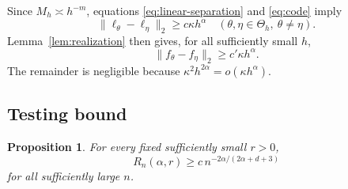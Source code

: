 \documentclass[11pt]{article}
\newtheorem{proposition}[theorem]{Proposition}
\theoremstyle{remark}
\begin{document}
Since \(M_h\asymp h^{-m}\), equations
\eqref{eq:linear-separation} and \eqref{eq:code} imply
\[
\|\ell_\theta-\ell_\eta\|_2\geq c\kappa h^\alpha
\quad(\theta,\eta\in\Theta_h,\ \theta\neq\eta).
\]
Lemma~\ref{lem:realization} then gives, for all sufficiently small \(h\),
\begin{equation}\label{eq:nonlinear-separation}
\|f_\theta-f_\eta\|_2\geq c'\kappa h^\alpha.
\end{equation}
The remainder is negligible because
\(\kappa^2h^{2\alpha}=o(\kappa h^\alpha)\).

\subsection{Testing bound}

\begin{proposition}\label{prop:lower}
For every fixed sufficiently small \(r>0\),
\[
R_n(\alpha,r)\geq c\,n^{-2\alpha/(2\alpha+d+3)}
\]
for all sufficiently large \(n\).
\end{proposition}
\end{document}
